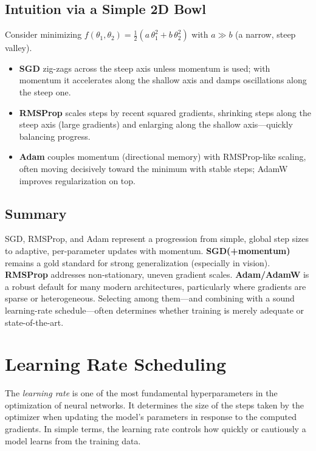 \documentclass[12pt,a4paper]{report}
\begin{document}
\vspace{1em}
\subsection{Intuition via a Simple 2D Bowl}

Consider minimizing $f(\theta_1,\theta_2)=\tfrac{1}{2}(a\,\theta_1^2 + b\,\theta_2^2)$ with $a \gg b$ (a narrow, steep valley).
\begin{itemize}
    \item \textbf{SGD} zig-zags across the steep axis unless momentum is used; with momentum it accelerates along the shallow axis and damps oscillations along the steep one.
    \item \textbf{RMSProp} scales steps by recent squared gradients, shrinking steps along the steep axis (large gradients) and enlarging along the shallow axis—quickly balancing progress.
    \item \textbf{Adam} couples momentum (directional memory) with RMSProp-like scaling, often moving decisively toward the minimum with stable steps; AdamW improves regularization on top.
\end{itemize}

\vspace{1em}
\subsection{Summary}

SGD, RMSProp, and Adam represent a progression from simple, global step sizes to adaptive, per-parameter updates with momentum. 
\textbf{SGD(+momentum)} remains a gold standard for strong generalization (especially in vision). 
\textbf{RMSProp} addresses non-stationary, uneven gradient scales. 
\textbf{Adam/AdamW} is a robust default for many modern architectures, particularly where gradients are sparse or heterogeneous.
Selecting among them—and combining with a sound learning-rate schedule—often determines whether training is merely adequate or state-of-the-art.


\section{Learning Rate Scheduling}

The \textit{learning rate} is one of the most fundamental hyperparameters in the optimization of neural networks.  
It determines the size of the steps taken by the optimizer when updating the model’s parameters in response to the computed gradients.  
In simple terms, the learning rate controls how quickly or cautiously a model learns from the training data.
\end{document}
